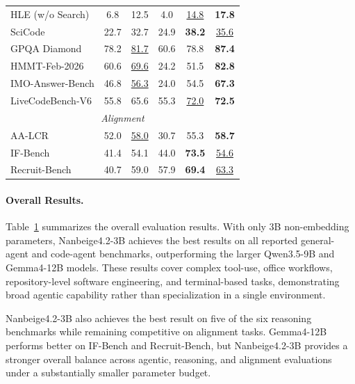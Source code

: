 \begin{table}[t]
\begin{tabular}{lccccc}
HLE (w/o Search)    & 6.8 & 12.5 & 4.0 & \underline{14.8} & \textbf{17.8}\\
SciCode            & 22.7 & {32.7} & 24.9 & \textbf{38.2} & \underline{35.6}\\
GPQA Diamond       & 78.2 & \underline{81.7} & 60.6 & 78.8 & \textbf{87.4}\\
HMMT-Feb-2026      & 60.6 & \underline{69.6} & 24.2 & 51.5 & \textbf{82.8}\\
IMO-Answer-Bench   & 46.8 & \underline{56.3} & 24.0 & 54.5 & \textbf{67.3}\\
LiveCodeBench-V6   & 55.8 & {65.6} & 55.3 & \underline{72.0} & \textbf{72.5}\\

\midrule

\multicolumn{6}{c}{\textit{Alignment}}\\
\midrule

AA-LCR             & 52.0 & \underline{58.0} & 30.7 & 55.3 & \textbf{58.7}\\
IF-Bench           & 41.4 & 54.1 & 44.0 & \textbf{73.5} & \underline{54.6}\\
Recruit-Bench      & 40.7 & 59.0 & 57.9 & \textbf{69.4} & \underline{63.3}\\

\bottomrule
\end{tabular}
\label{tab:overall_benchmarks}
\end{table}


\paragraph{Overall Results.}

Table~\ref{tab:overall_benchmarks} summarizes the overall evaluation results. With only 3B non-embedding parameters, Nanbeige4.2-3B achieves the best results on all reported general-agent and code-agent benchmarks, outperforming the larger Qwen3.5-9B and Gemma4-12B models. These results cover complex tool-use, office workflows, repository-level software engineering, and terminal-based tasks, demonstrating broad agentic capability rather than specialization in a single environment.

Nanbeige4.2-3B also achieves the best result on five of the six reasoning benchmarks while remaining competitive on alignment tasks. Gemma4-12B performs better on IF-Bench and Recruit-Bench, but Nanbeige4.2-3B provides a stronger overall balance across agentic, reasoning, and alignment evaluations under a substantially smaller parameter budget.




